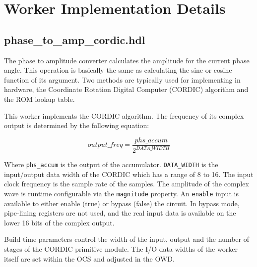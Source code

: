 \documentclass{article}
\def\comp{phase\_to\_amp\_cordic}
\begin{document}
\section*{Worker Implementation Details}
\subsection*{\comp.hdl}
\begin{flushleft}
	The phase to amplitude converter calculates the amplitude for the current phase angle.  This operation is basically the same as calculating the sine or cosine function of its argument.  Two methods are typically used for implementing in hardware, the Coordinate Rotation Digital Computer (CORDIC) algorithm and the ROM lookup table.\medskip

	This worker implements the CORDIC algorithm. The frequency of its complex output is determined by the following equation:

	\begin{equation} \label{eq:output_freq}
		output\_freq = \frac{phs\_accum}{2^{DATA\_WIDTH}}
	\end{equation}

	Where \verb+phs_accum+ is the output of the accumulator. \verb+DATA_WIDTH+ is the input/output data width of the CORDIC which has a range of 8 to 16. The input clock frequency is the sample rate of the samples. The amplitude of the complex wave is runtime configurable via the \verb+magnitude+ property.  An \verb+enable+ input is available to either enable (true) or bypass (false) the circuit. In bypass mode, pipe-lining registers are not used, and the real input data is available on the lower 16 bits of the complex output.\medskip

	Build time parameters control the width of the input, output and the number of stages of the CORDIC primitive module. The I/O data widths of the worker itself are set within the OCS and adjusted in the OWD.
\end{flushleft}
\end{document}
